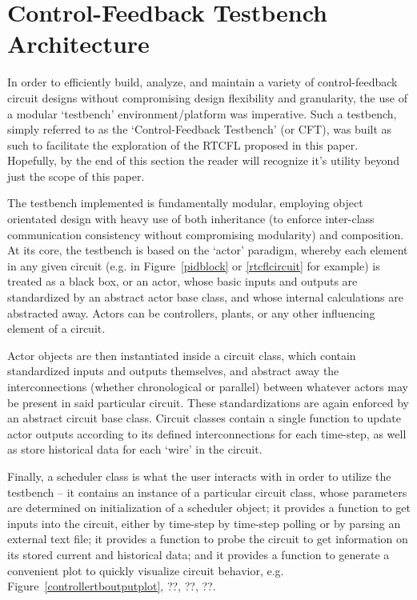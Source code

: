 \documentclass[10pt,twocolumn,letterpaper]{article}
\begin{document}
    \section{Control-Feedback Testbench Architecture} \label{tbarch}

        In order to efficiently build, analyze, and maintain a variety of control-feedback circuit designs without
        compromising design flexibility and granularity, the use of a modular `testbench' environment/platform was
        imperative. Such a testbench, simply referred to as the `Control-Feedback Testbench' (or CFT), was built as such
        to facilitate the exploration of the RTCFL proposed in this paper. Hopefully, by the end of this section the
        reader will recognize it's utility beyond just the scope of this paper.

        The testbench implemented is fundamentally modular, employing object orientated design with heavy use of both
        inheritance (to enforce inter-class communication consistency without compromising modularity) and composition.
        At its core, the testbench is based on the `actor' paradigm, whereby each element in any given circuit (e.g. in
        Figure~\ref{pidblock} or \ref{rtcflcircuit} for example) is treated as a black box, or an actor, whose basic
        inputs and outputs are standardized by an abstract actor base class, and whose internal calculations are
        abstracted away. Actors can be controllers, plants, or any other influencing element of a circuit. 
        
        Actor objects are then instantiated inside a circuit class, which contain standardized inputs and outputs
        themselves, and abstract away the interconnections (whether chronological or parallel) between whatever actors
        may be present in said particular circuit. These standardizations are again enforced by an abstract circuit base
        class. Circuit classes contain a single function to update actor outputs according to its defined
        interconnections for each time-step, as well as store historical data for each `wire' in the circuit.
        
        Finally, a scheduler class is what the user interacts with in order to utilize the testbench -- it contains an
        instance of a particular circuit class, whose parameters are determined on initialization of a scheduler object;
        it provides a function to get inputs into the circuit, either by time-step by time-step polling or by parsing an
        external text file; it provides a function to probe the circuit to get information on its stored current and
        historical data; and it provides a function to generate a convenient plot to quickly visualize circuit behavior,
        e.g. Figure~\ref{controllertboutputplot}, ??, ??, ??.
        
\end{document}
